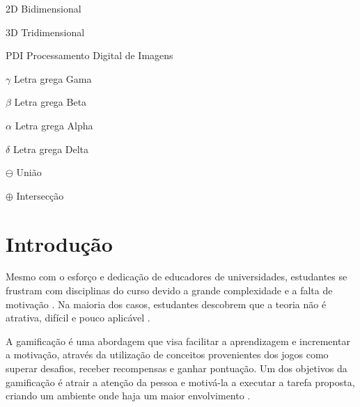 \documentclass[
	12pt,				%
	oneside,			%
	a4paper,			%
	english,			%
	french,				%
	spanish,			%
	brazil,				%
	]{abntex2}
\begin{document}

\listoffigures*
\cleardoublepage

\listoftables*
\cleardoublepage

\begin{siglas}
  \item[2D] Bidimensional
  \item[3D] Tridimensional
  \item[PDI] Processamento Digital de Imagens
\end{siglas}

\begin{simbolos}
  \item[$ \gamma $] Letra grega Gama
  \item[$ \beta $] Letra grega Beta
  \item[$ \alpha $] Letra grega Alpha
  \item[$ \delta $] Letra grega Delta
  \item[$ \ominus $] União
  \item[$ \oplus $] Intersecção
  
\end{simbolos}

\tableofcontents*
\cleardoublepage


\textual

\chapter{Introdução}

Mesmo com o esforço e dedicação de educadores de universidades, estudantes se frustram com disciplinas do curso devido a grande complexidade e a falta de motivação \cite{garcia2015colfdimap}. Na maioria dos casos, estudantes descobrem que a teoria não é atrativa, difícil e pouco aplicável \cite{zin2015transforming}.

A gamificação é uma abordagem que visa facilitar a aprendizagem e incrementar a motivação, através da utilização de conceitos provenientes dos jogos como superar desafios, receber recompensas e ganhar pontuação. Um dos objetivos da gamificação é atrair a atenção da pessoa e motivá-la a executar a tarefa proposta, criando um ambiente onde haja um maior envolvimento \cite{kaap:2014}.   
\end{document}
